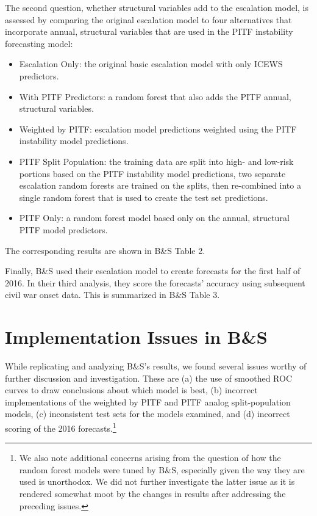 \documentclass[
]{article}
\providecommand{\tightlist}{%
  \setlength{\itemsep}{0pt}\setlength{\parskip}{0pt}}
\begin{document}
The second question, whether structural variables add to the escalation model, is assessed by comparing the original escalation model to four alternatives that incorporate annual, structural variables that are used in the PITF instability forecasting model:

\begin{itemize}
\tightlist
\item
  Escalation Only: the original basic escalation model with only ICEWS predictors.
\item
  With PITF Predictors: a random forest that also adds the PITF annual, structural variables.
\item
  Weighted by PITF: escalation model predictions weighted using the PITF instability model predictions.
\item
  PITF Split Population: the training data are split into high- and low-risk portions based on the PITF instability model predictions, two separate escalation random forests are trained on the splits, then re-combined into a single random forest that is used to create the test set predictions.
\item
  PITF Only: a random forest model based only on the annual, structural PITF model predictors.
\end{itemize}

The corresponding results are shown in B\&S Table 2.

Finally, B\&S used their escalation model to create forecasts for the first half of 2016. In their third analysis, they score the forecasts' accuracy using subsequent civil war onset data. This is summarized in B\&S Table 3.

\hypertarget{implementation-issues-in-bs}{%
\section{Implementation Issues in B\&S}\label{implementation-issues-in-bs}}

While replicating and analyzing B\&S's results, we found several issues worthy of further discussion and investigation. These are (a) the use of smoothed ROC curves to draw conclusions about which model is best, (b) incorrect implementations of the weighted by PITF and PITF analog split-population models, (c) inconsistent test sets for the models examined, and (d) incorrect scoring of the 2016 forecasts.\footnote{We also note additional concerns arising from the question of how the random forest models were tuned by B\&S, especially given the way they are used is unorthodox. We did not further investigate the latter issue as it is rendered somewhat moot by the changes in results after addressing the preceding issues.}
\end{document}
